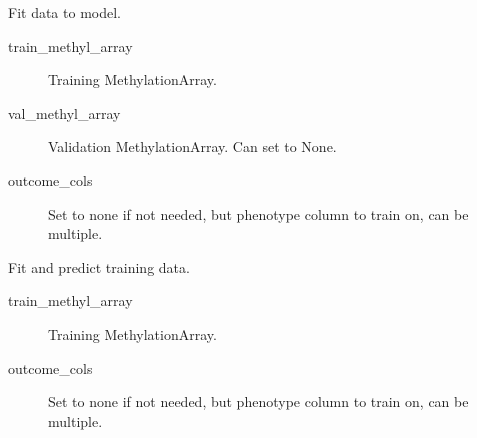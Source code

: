 \documentclass[letterpaper,10pt,english]{sphinxmanual}
\begin{document}
\begin{fulllineitems}
\begin{fulllineitems}
\begin{description}
\end{description}

\end{fulllineitems}


\begin{fulllineitems}
\label{\detokenize{index:pymethylprocess.general_machine_learning.MachineLearning.fit}}
Fit data to model.
\begin{description}
\item[{train\_methyl\_array}] \leavevmode
Training MethylationArray.

\item[{val\_methyl\_array}] \leavevmode
Validation MethylationArray. Can set to None.

\item[{outcome\_cols}] \leavevmode
Set to none if not needed, but phenotype column to train on, can be multiple.

\end{description}

\end{fulllineitems}


\begin{fulllineitems}
\label{\detokenize{index:pymethylprocess.general_machine_learning.MachineLearning.fit_predict}}
Fit and predict training data.
\begin{description}
\item[{train\_methyl\_array}] \leavevmode
Training MethylationArray.

\item[{outcome\_cols}] \leavevmode
Set to none if not needed, but phenotype column to train on, can be multiple.

\end{description}

\end{fulllineitems}


\end{fulllineitems}
\end{document}
